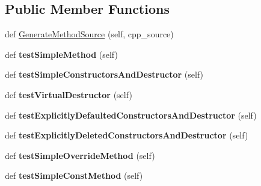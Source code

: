 \subsection*{Public Member Functions}
\begin{DoxyCompactItemize}
\item 
def \hyperlink{classcpp_1_1gmock__class__test_1_1GenerateMethodsTest_af96a6c9fd394f7e27cf24f86814549c9}{Generate\+Method\+Source} (self, cpp\+\_\+source)
\item 
def {\bfseries test\+Simple\+Method} (self)\hypertarget{classcpp_1_1gmock__class__test_1_1GenerateMethodsTest_a3ece43a88823e3fe1b4731819505bd61}{}\label{classcpp_1_1gmock__class__test_1_1GenerateMethodsTest_a3ece43a88823e3fe1b4731819505bd61}

\item 
def {\bfseries test\+Simple\+Constructors\+And\+Destructor} (self)\hypertarget{classcpp_1_1gmock__class__test_1_1GenerateMethodsTest_abb0adf9fa7afd25d63964a9075af1414}{}\label{classcpp_1_1gmock__class__test_1_1GenerateMethodsTest_abb0adf9fa7afd25d63964a9075af1414}

\item 
def {\bfseries test\+Virtual\+Destructor} (self)\hypertarget{classcpp_1_1gmock__class__test_1_1GenerateMethodsTest_a3095f7046a089b3c8a13e7e8161a2ab2}{}\label{classcpp_1_1gmock__class__test_1_1GenerateMethodsTest_a3095f7046a089b3c8a13e7e8161a2ab2}

\item 
def {\bfseries test\+Explicitly\+Defaulted\+Constructors\+And\+Destructor} (self)\hypertarget{classcpp_1_1gmock__class__test_1_1GenerateMethodsTest_a0a2a15e9eb43aff0fec7e89a81c30987}{}\label{classcpp_1_1gmock__class__test_1_1GenerateMethodsTest_a0a2a15e9eb43aff0fec7e89a81c30987}

\item 
def {\bfseries test\+Explicitly\+Deleted\+Constructors\+And\+Destructor} (self)\hypertarget{classcpp_1_1gmock__class__test_1_1GenerateMethodsTest_a4e6c2d2de1e21e63672ebbb75676c45c}{}\label{classcpp_1_1gmock__class__test_1_1GenerateMethodsTest_a4e6c2d2de1e21e63672ebbb75676c45c}

\item 
def {\bfseries test\+Simple\+Override\+Method} (self)\hypertarget{classcpp_1_1gmock__class__test_1_1GenerateMethodsTest_a2b1501cf9517acbeb48d11e9d8992a9b}{}\label{classcpp_1_1gmock__class__test_1_1GenerateMethodsTest_a2b1501cf9517acbeb48d11e9d8992a9b}

\item 
def {\bfseries test\+Simple\+Const\+Method} (self)\hypertarget{classcpp_1_1gmock__class__test_1_1GenerateMethodsTest_ad8cb9c2f99fa65c7d3fee054dde0e30d}{}\label{classcpp_1_1gmock__class__test_1_1GenerateMethodsTest_ad8cb9c2f99fa65c7d3fee054dde0e30d}


\end{DoxyCompactItemize}
